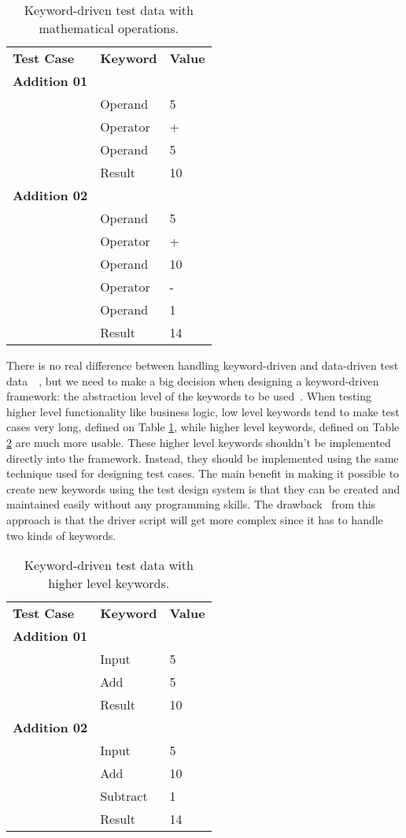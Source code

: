 \begin{table}[!ht]
\centering
\begin{tabular}{lll}
\textbf{Test Case} & \textbf{Keyword} & \textbf{Value} \\
\textbf{Addition 01} & & \\
& Operand & 5 \\
& Operator & + \\
& Operand & 5 \\
& Result & 10 \\
\textbf{Addition 02}  & & \\
& Operand & 5 \\
& Operator & + \\
& Operand & 10 \\
& Operator & - \\
& Operand & 1 \\
& Result & 14 \\
\end{tabular}
\caption{Keyword-driven test data with mathematical operations.}
\label{table:tab2}
\end{table}

\noindent There is no real difference between handling keyword-driven and data-driven test
data~\cite{Fewster99}~\cite{Lau07}, but we need to make a big decision when designing a keyword-driven framework:
the abstraction level of the keywords to be used~\cite{Lau07}. When testing higher level
functionality like business logic, low level keywords tend to make test cases
very long, defined on Table \ref{table:tab2}, while higher level keywords, defined
on Table \ref{table:tab3} are much more usable. These higher level keywords shouldn't
be implemented directly into the framework. Instead, they should be implemented
using the same technique used for designing test cases. The main benefit in
making it possible to create new keywords using the test design system is that
they can be created and maintained easily without any programming skills. The
drawback~\cite{Lau07} from this approach is that the driver script will get more
complex since it has to handle two kinds of keywords.

\begin{table}[!ht]
\centering
\begin{tabular}{lll}
\textbf{Test Case} & \textbf{Keyword} & \textbf{Value} \\
\textbf{Addition 01} & & \\
& Input & 5 \\
& Add & 5 \\
& Result & 10 \\
\textbf{Addition 02} & & \\
& Input & 5 \\
& Add & 10 \\
& Subtract & 1 \\
& Result & 14 \\
\end{tabular}
\caption{Keyword-driven test data with higher level keywords.}
\label{table:tab3}
\end{table}

